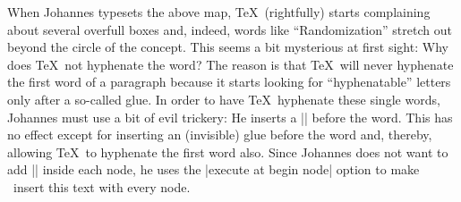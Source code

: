 When Johannes typesets the above map, \TeX\ (rightfully) starts complaining
about several overfull boxes and, indeed, words like ``Randomization'' stretch
out beyond the circle of the concept. This seems a bit mysterious at first
sight: Why does \TeX\ not hyphenate the word? The reason is that \TeX\ will
never hyphenate the first word of a paragraph because it starts looking for
``hyphenatable'' letters only after a so-called glue. In order to have \TeX\
hyphenate these single words, Johannes must use a bit of evil trickery: He
inserts a |\hskip0pt| before the word. This has no effect except for inserting
an (invisible) glue before the word and, thereby, allowing \TeX\ to hyphenate
the first word also. Since Johannes does not want to add |\hskip0pt| inside
each node, he uses the |execute at begin node| option to make \tikzname\ insert
this text with every node.
%
